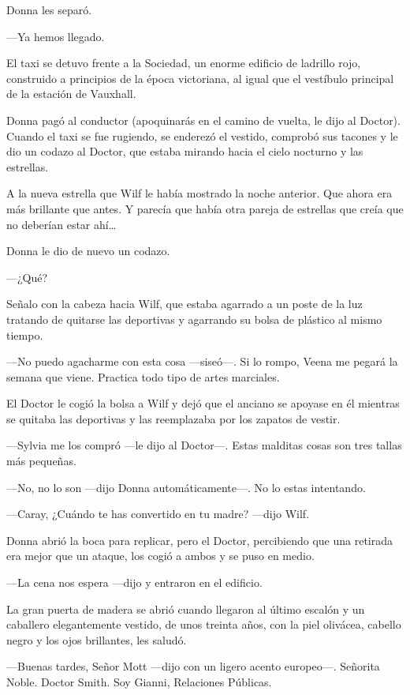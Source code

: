 Donna les separó.

---Ya hemos llegado.

El taxi se detuvo frente a la Sociedad, un enorme edificio de ladrillo
rojo, construido a principios de la época victoriana, al igual que el
vestíbulo principal de la estación de Vauxhall.

Donna pagó al conductor (apoquinarás en el camino de vuelta, le dijo al
Doctor). Cuando el taxi se fue rugiendo, se enderezó el vestido,
comprobó sus tacones y le dio un codazo al Doctor, que estaba mirando
hacia el cielo nocturno y las estrellas.

A la nueva estrella que Wilf le había mostrado la noche anterior. Que
ahora era más brillante que antes. Y parecía que había otra pareja de
estrellas que creía que no deberían estar ahí\ldots{}

Donna le dio de nuevo un codazo.

---¿Qué?

Señalo con la cabeza hacia Wilf, que estaba agarrado a un poste de la
luz tratando de quitarse las deportivas y agarrando su bolsa de plástico
al mismo tiempo.

---No puedo agacharme con esta cosa ---siseó---. Si lo rompo, Veena me
pegará la semana que viene. Practica todo tipo de artes marciales.

El Doctor le cogió la bolsa a Wilf y dejó que el anciano se apoyase en
él mientras se quitaba las deportivas y las reemplazaba por los zapatos
de vestir.

---Sylvia me los compró ---le dijo al Doctor---. Estas malditas cosas
son tres tallas más pequeñas.

---No, no lo son ---dijo Donna automáticamente---. No lo estas
intentando.

---Caray, ¿Cuándo te has convertido en tu madre? ---dijo Wilf.

Donna abrió la boca para replicar, pero el Doctor, percibiendo que una
retirada era mejor que un ataque, los cogió a ambos y se puso en medio.

---La cena nos espera ---dijo y entraron en el edificio.

La gran puerta de madera se abrió cuando llegaron al último escalón y un
caballero elegantemente vestido, de unos treinta años, con la piel
olivácea, cabello negro y los ojos brillantes, les saludó.

---Buenas tardes, Señor Mott ---dijo con un ligero acento europeo---.
Señorita Noble. Doctor Smith. Soy Gianni, Relaciones Públicas.


